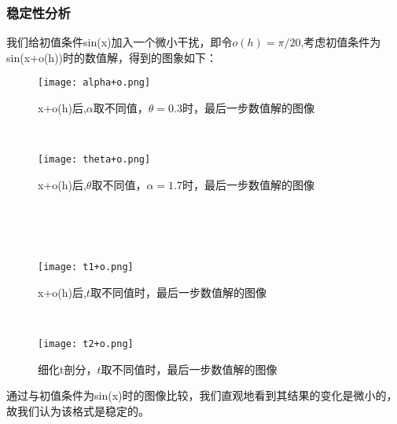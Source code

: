 \subsubsection{稳定性分析}
我们给初值条件sin(x)加入一个微小干扰，即令$o(h)=\pi/20$,考虑初值条件为sin(x+o(h))时的数值解，得到的图象如下：
\begin{figure}[h]
	\begin{minipage}[t]{0.4\linewidth}%
		\centering     %
		\texttt{[image: alpha+o.png]}
		\caption{x+o(h)后,$\alpha$取不同值，$\theta=0.3$时，最后一步数值解的图像}%
		\label{fig:liuchengtu1}%
	\end{minipage} 
	\hfill
	\begin{minipage}[t]{0.4\linewidth}
		\centering
		\texttt{[image: theta+o.png]}
		\caption{x+o(h)后,$\theta$取不同值，$\alpha=1.7$时，最后一步数值解的图像}%
		\label{fig:liuchengtu2}
	\end{minipage}
\end{figure}
\\
\\
\\
\begin{figure}[h]
	\begin{minipage}[t]{0.4\linewidth}%
		\centering     %
		\texttt{[image: t1+o.png]}
		\caption{x+o(h)后,$t$取不同值时，最后一步数值解的图像}%
		\label{fig:liuchengtu1}%
	\end{minipage} 
	\hfill
	\begin{minipage}[t]{0.4\linewidth}
		\centering
		\texttt{[image: t2+o.png]}
		\caption{细化t剖分，$t$取不同值时，最后一步数值解的图像}%
		\label{fig:liuchengtu2}
	\end{minipage}
\end{figure}

通过与初值条件为sin(x)时的图像比较，我们直观地看到其结果的变化是微小的，故我们认为该格式是稳定的。
